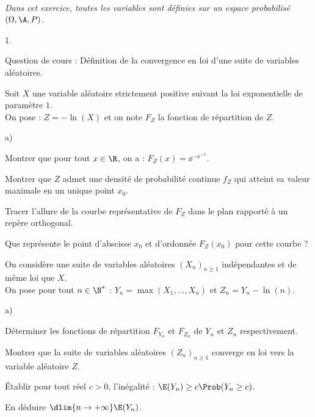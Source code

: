 \documentclass[11pt]{article}%
\begin{document}

\begin{exerciceAP}~\\
  {\it Dans cet exercice, toutes les variables sont définies sur un
    espace probabilisé $(\Omega,\A,P)$.}
  \begin{noliste}{1.}
    \setlength{\itemsep}{2mm}
  \item Question de cours : Définition de la convergence en loi d'une
    suite de variables aléatoires.
  \item Soit $X$ une variable aléatoire strictement positive suivant
    la loi exponentielle de paramètre $1$.\\
    On pose : $Z=-\ln(X)$ et on note $F_Z$ la fonction de répartition
    de $Z$.
    \begin{noliste}{a)}
    \setlength{\itemsep}{2mm}
    \item Montrer que pour tout $x\in\R$, on a :
      $F_Z(x)=\ee^{-\ee^{-x}}$.
    \item Montrer que $Z$ admet une densité de probabilité continue
      $f_Z$ qui atteint sa valeur maximale en un unique point $x_0$.
    \item Tracer l'allure de la courbe représentative de $F_Z$ dans le
      plan rapporté à un repère orthogonal.
    \item Que représente le point d'abscisse $x_0$ et d'ordonnée
      $F_Z(x_0)$ pour cette courbe ?
    \end{noliste}
  \item On considère une suite de variables aléatoires $(X_n)_{n\geq
      1}$ indépendantes et de même loi que $X$.\\
    On pose pour tout $n\in\N^*$ : $Y_n=\max(X_1,\hdots,X_n)$ et
    $Z_n=Y_n-\ln(n)$.
    \begin{noliste}{a)}
    \setlength{\itemsep}{2mm}
    \item Déterminer les fonctions de répartition $F_{Y_n}$ et
      $F_{Z_n}$ de $Y_n$ et $Z_n$ respectivement.
    \item Montrer que la suite de variables aléatoires $(Z_n)_{n\geq
        1}$ converge en loi vers la variable aléatoire $Z$.
    \item Établir pour tout réel $c>0$, l'inégalité : $\E(Y_n)\geq
      c\Prob(Y_n\geq c)$.
    \item En déduire $\dlim{n\to+\infty} \E(Y_n)$.
    \end{noliste}
  \end{noliste}
\end{exerciceAP}
\end{document}
